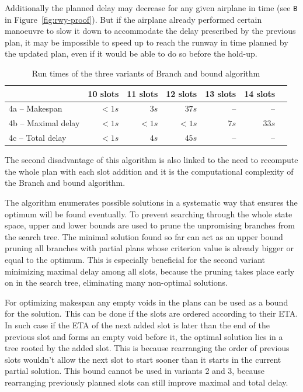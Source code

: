 Additionally the planned delay may decrease for any given airplane in time (see \texttt{B} in Figure~\ref{fig:rwy-proof}). But if the airplane already performed certain manoeuvre to slow it down to accommodate the delay prescribed by the previous plan, it may be impossible to speed up to reach the runway in time planned by the updated plan, even if it would be able to do so before the hold-up.

\begin{table}[h]
  \centering
\begin{tabular}{ | l || r | r | r | r | r | r | }
\hline
			& 10 slots	& 11 slots	& 12 slots	& 13 slots	& 14 slots	\\
\hline
4a – Makespan	& $< 1s$	& $3s$		& $37s$		& –			& –			\\
4b – Maximal delay	& $< 1s$	& $< 1s$	& $< 1s$	& $7s$		& $33s$		\\
4c – Total delay	& $< 1s$	& $4s$		& $45s$		& –			& –			\\
\hline
\end{tabular}
  \caption{Run times of the three variants of Branch and bound algorithm}
  \label{tab:alg5-runtime}
\end{table}

The second disadvantage of this algorithm is also linked to the need to recompute the whole plan with each slot addition and it is the computational complexity of the Branch and bound algorithm.

The algorithm enumerates possible solutions in a systematic way that ensures the optimum will be found eventually. To prevent searching through the whole state space, upper and lower bounds are used to prune the unpromising branches from the search tree. The minimal solution found so far can act as an upper bound pruning all branches with partial plans whose criterion value is already bigger or equal to the optimum. This is especially beneficial for the second variant minimizing maximal delay among all slots, because the pruning takes place early on in the search tree, eliminating many non-optimal solutions.

For optimizing makespan any empty voids in the plans can be used as a bound for the solution. This can be done if the slots are ordered according to their ETA. In such case if the ETA of the next added slot is later than the end of the previous slot and forms an empty void before it, the optimal solution lies in a tree rooted by the added slot. This is because rearranging the order of previous slots wouldn't allow the next slot to start sooner than it starts in the current partial solution. This bound cannot be used in variants 2 and 3, because rearranging previously planned slots can still improve maximal and total delay.

